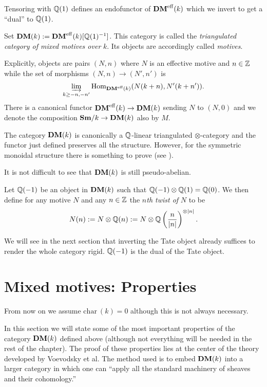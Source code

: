 Tensoring with $\mathbb{Q}(1)$ defines an endofunctor of
$\mathbf{DM}^{\mathrm{eff}}(k)$ which we invert to get a ``dual'' to $\mathbb{Q}(1)$.
\begin{defn}
Set $\mathbf{DM}(k):= \mathbf{DM}^{\mathrm{eff}}(k)[\mathbb{Q}(1)^{-1}]$. This category is
called the \emph{triangulated category of mixed motives over} $k$. Its
objects are accordingly called \emph{motives}.
\end{defn}
Explicitly, objects are pairs $(N,n)$ where $N$ is an effective
motive and $n\in\mathbb{Z}$ while the set of morphisms $(N,n)\to (N',n')$ is
\begin{equation*}
  \varinjlim_{k\geq -n,-n'}\mathrm{Hom}_{\mathbf{DM}^{\mathrm{eff}}(k)}(N(k+n),N'(k+n')).
\end{equation*}
There is a canonical functor $\mathbf{DM}^{\mathrm{eff}}(k)\to\mathbf{DM}(k)$ sending
$N$ to $(N,0)$ and we denote the composition $\mathbf{Sm}/k\to \mathbf{DM}(k)$ also by
$M$.
\begin{rem}
The category $\mathbf{DM}(k)$ is canonically a $\mathbb{Q}$-linear triangulated
$\otimes$-category and the functor just defined preserves all the
structure. However, for the symmetric monoidal structure there is
something to prove (see \cite[17.1.2]{andre04-motifs}).

It is not difficult to see that $\mathbf{DM}(k)$ is still pseudo-abelian.
\end{rem}

\begin{defn}
  Let $\mathbb{Q}(-1)$ be an object in $\mathbf{DM}(k)$ such that
  $\mathbb{Q}(-1)\otimes\mathbb{Q}(1)=\mathbb{Q}(0)$. We then define for any motive $N$ and
  any $n\in\mathbb{Z}$ the $n$\emph{th twist of} $N$ to be
  \begin{equation*}
    N(n):=N\otimes \mathbb{Q}(n):=N\otimes \mathbb{Q}\left(\frac{n}{|n|}\right)^{\otimes |n|}.
  \end{equation*}
\end{defn}

We will see in the next section that inverting the Tate object already
suffices to render the whole category rigid. $\mathbb{Q}(-1)$ is the dual of
the Tate object.

\section{Mixed motives: Properties}
\label{sec:9-prop}
From now on we assume $\mathrm{char~}(k) = 0$ although this is not always
necessary.

In this section we will state some of the most important properties of
the category $\mathbf{DM}(k)$ defined above (although not everything will be
needed in the rest of the chapter). The proof of these properties lies
at the center of the theory developed by Voevodsky et al. The method
used is to embed $\mathbf{DM}(k)$ into a larger category in which one can
``apply all the standard machinery of sheaves and their cohomology.''
\cite[p.~7]{voevodsky00-mm}

